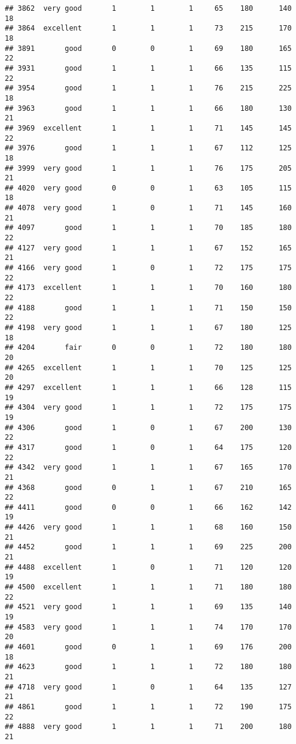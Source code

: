 \documentclass[]{article}
\begin{document}
\begin{verbatim}
## 3862  very good       1        1        1     65    180      140  18
## 3864  excellent       1        1        1     73    215      170  18
## 3891       good       0        0        1     69    180      165  22
## 3931       good       1        1        1     66    135      115  22
## 3954       good       1        1        1     76    215      225  18
## 3963       good       1        1        1     66    180      130  21
## 3969  excellent       1        1        1     71    145      145  22
## 3976       good       1        1        1     67    112      125  18
## 3999  very good       1        1        1     76    175      205  21
## 4020  very good       0        0        1     63    105      115  18
## 4078  very good       1        0        1     71    145      160  21
## 4097       good       1        1        1     70    185      180  22
## 4127  very good       1        1        1     67    152      165  21
## 4166  very good       1        0        1     72    175      175  22
## 4173  excellent       1        1        1     70    160      180  22
## 4188       good       1        1        1     71    150      150  22
## 4198  very good       1        1        1     67    180      125  18
## 4204       fair       0        0        1     72    180      180  20
## 4265  excellent       1        1        1     70    125      125  20
## 4297  excellent       1        1        1     66    128      115  19
## 4304  very good       1        1        1     72    175      175  19
## 4306       good       1        0        1     67    200      130  22
## 4317       good       1        0        1     64    175      120  22
## 4342  very good       1        1        1     67    165      170  21
## 4368       good       0        1        1     67    210      165  22
## 4411       good       0        0        1     66    162      142  19
## 4426  very good       1        1        1     68    160      150  21
## 4452       good       1        1        1     69    225      200  21
## 4488  excellent       1        0        1     71    120      120  19
## 4500  excellent       1        1        1     71    180      180  22
## 4521  very good       1        1        1     69    135      140  19
## 4583  very good       1        1        1     74    170      170  20
## 4601       good       0        1        1     69    176      200  18
## 4623       good       1        1        1     72    180      180  21
## 4718  very good       1        0        1     64    135      127  21
## 4861       good       1        1        1     72    190      175  22
## 4888  very good       1        1        1     71    200      180  21

\end{verbatim}
\end{document}
